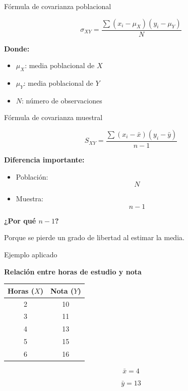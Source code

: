 \documentclass{beamer}
\begin{document}
\begin{frame}{Fórmula de covarianza poblacional}

\[
\sigma_{XY}
=
\frac{\sum (x_i-\mu_X)(y_i-\mu_Y)}{N}
\]

\vspace{0.4cm}

\textbf{Donde:}

\begin{itemize}
\item \(\mu_X\): media poblacional de \(X\)
\item \(\mu_Y\): media poblacional de \(Y\)
\item \(N\): número de observaciones
\end{itemize}

\end{frame}

\begin{frame}{Fórmula de covarianza muestral}

\[
S_{XY}
=
\frac{\sum (x_i-\bar{x})(y_i-\bar{y})}{n-1}
\]

\vspace{0.4cm}

\textbf{Diferencia importante:}

\begin{itemize}
\item Población:
\[
N
\]

\item Muestra:
\[
n-1
\]
\end{itemize}

\vspace{0.3cm}

\textbf{¿Por qué \(n-1\)?}

Porque se pierde un grado de libertad al estimar la media.

\end{frame}

\begin{frame}{Ejemplo aplicado}

\textbf{Relación entre horas de estudio y nota}

\vspace{0.3cm}

\begin{center}
\begin{tabular}{cc}
\toprule
Horas (\(X\)) & Nota (\(Y\)) \\
\midrule
2 & 10 \\
3 & 11 \\
4 & 13 \\
5 & 15 \\
6 & 16 \\
\bottomrule
\end{tabular}
\end{center}

\vspace{0.3cm}

\[
\bar{x}=4
\]

\[
\bar{y}=13
\]

\end{frame}
\end{document}
